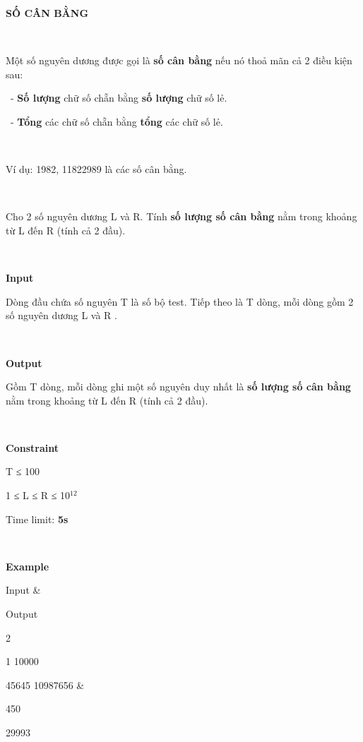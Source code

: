 

\textbf{SỐ CÂN BẰNG}

 

Một số nguyên dương được gọi là \textbf{số cân bằng} nếu nó thoả mãn cả 2 điều kiện sau:

 - \textbf{Số lượng} chữ số chẵn bằng \textbf{số lượng} chữ số lẻ.

 - \textbf{Tổng} các chữ số chẵn bằng \textbf{tổng} các chữ số lẻ.

 

Ví dụ: 1982, 11822989 là các số cân bằng.

 

Cho 2 số nguyên dương L và R. Tính \textbf{số lượng số cân bằng} nằm trong khoảng từ L đến R (tính cả 2 đầu).

 

\textbf{Input}

Dòng đầu chứa số nguyên T là số bộ test. Tiếp theo là T dòng, mỗi dòng gồm 2 số nguyên dương L và R .

 

\textbf{Output}

Gồm T dòng, mỗi dòng ghi một số nguyên duy nhất là \textbf{số lượng số cân bằng} nằm trong khoảng từ L đến R (tính cả 2 đầu).

 

\textbf{Constraint}

T ≤ 100

1 ≤ L ≤ R ≤ 10$^12$

Time limit: \textbf{5s}

 

\textbf{Example}
\begin{tabular}\hline 


Input & 

Output  
\hline


2

1   10000

45645   10987656 & 

450

29993  
\hline

\end{tabular}

 

 
